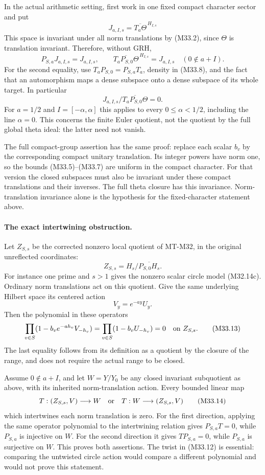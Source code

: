 In the actual arithmetic setting,
first work in one fixed compact character sector and put
\[
          J_{a,I,s}=\overline{T_a\Theta}^{\,H_{I,s}}
 \tag{M33.8}
\]
This space is invariant under all norm translations by (M33.2),
since $\Theta$ is translation invariant.
Therefore, without GRH,
\[
 P_{S,a}J_{a,I,s}=J_{a,I,s},\qquad
 \overline{T_aP_{S,0}\Theta}^{\,H_{I,s}}=J_{a,I,s}
                   \quad(0\notin a+I).
 \tag{M33.9}
\]
For the second equality, use
$T_aP_{S,0}=P_{S,a}T_a$, density in (M33.8), and
the fact that an automorphism maps a dense subspace
onto a dense subspace of its whole target.
In particular
\[
       J_{a,I,s}/\overline{T_aP_{S,0}\Theta}=0.
 \tag{M33.10}
\]
For $a=1/2$ and $I=[-\alpha,\alpha]$ this applies
to every $0\leq\alpha<1/2$, including the line
$\alpha=0$.  This concerns the finite Euler quotient,
not the quotient by the full global theta ideal:
the latter need not vanish.

The full compact-group assertion has the same proof:
replace each scalar $b_v$ by the corresponding compact
unitary translation.  Its integer powers have norm one,
so the bounds (M33.5)--(M33.7) are uniform in the compact
character.  For that version the closed subspaces must
also be invariant under these compact translations and
their inverses.  The full theta closure has this
invariance.  Norm-translation invariance alone is the
hypothesis for the fixed-character statement above.

\paragraph{The exact intertwining obstruction.}
Let $Z_{S,s}$ be the corrected nonzero local quotient of
MT-M32, in the original unreflected coordinates:
\[
       Z_{S,s}=H_s/\overline{P_{S,0}H_s}.
 \tag{M33.11}
\]
For instance one prime and $s>1$ gives the nonzero
scalar circle model (M32.14c).
Ordinary norm translations act on this quotient.
Give the same underlying Hilbert space its centered
action
\[
                   V_y=e^{-ay}U_y.
 \tag{M33.12}
\]
Then the polynomial in these operators
\[
       \prod_{v\in S}(1-b_ve^{-ah_v}V_{-h_v})
       =\prod_{v\in S}(1-b_vU_{-h_v})
       =0\quad\hbox{on }Z_{S,s}.
 \tag{M33.13}
\]
The last equality follows from its definition as a
quotient by the closure of the range, and does not
require the actual range to be closed.

Assume $0\notin a+I$, and let $W=Y/Y_0$ be any
closed invariant subquotient as above, with its
inherited norm-translation action.  Every bounded
linear map
\[
       T:(Z_{S,s},V)\longrightarrow W
       \quad\hbox{or}\quad
       T:W\longrightarrow(Z_{S,s},V)
 \tag{M33.14}
\]
which intertwines each norm translation is zero.
For the first direction, applying the same operator
polynomial to the intertwining relation gives
$P_{S,a}T=0$, while $P_{S,a}$ is injective on $W$.
For the second direction it gives $TP_{S,a}=0$,
while $P_{S,a}$ is surjective on $W$.
This proves both assertions.  The twist in (M33.12)
is essential: comparing the untwisted circle action
would compare a different polynomial and would not
prove this statement.

